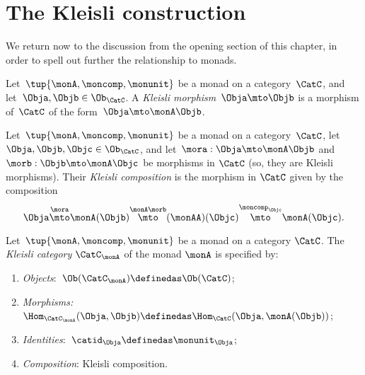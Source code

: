 
\section{The Kleisli construction}
\label{sec:Kleisli}

We return now to the discussion from the opening section of this chapter, in order to spell out further the relationship to monads.

\begin{ctdefinition}
    \label{def:kleislimor}
    Let~$\tup{\monA, \moncomp, \monunit}$ be a monad on a category~$\CatC$, and let~$\Obja, \Objb \in \Ob_\CatC$.
    A
    \emph{Kleisli morphism}~$\Obja \mto \Objb$ is a morphism of~$\CatC$ of the form~$\Obja \mto \monA \Objb$.
\end{ctdefinition}

\begin{ctdefinition}
    \label{def:kleislicomp}
    Let~$\tup{\monA, \moncomp, \monunit}$ be a monad on a category~$\CatC$, let~$\Obja, \Objb, \Objc \in \Ob_\CatC$,  and let~$\mora : \Obja \mto \monA \Objb$ and $\morb : \Objb \mto \monA \Objc$ be morphisms in $\CatC$ (so, they are Kleisli morphisms).
    Their \emph{Kleisli composition} is the morphism in $\CatC$ given by the composition
    \begin{equation}
        \Obja \overset{\mora}{\mto} \monA(\Objb) \overset{\monA \morb}{\mto} (\monAA)(\Objc) \overset{\moncomp_\Objc}{\mto} \monA(\Objc).
    \end{equation}
\end{ctdefinition}

\begin{ctdefinition}
    \label{def:kleislicat}
    Let~$\tup{\monA, \moncomp, \monunit}$ be a monad on a category $\CatC$.
    The \emph{Kleisli category} $\CatC_\monA$ of the monad $\monA$ is specified by:
    \begin{enumerate}
        \item \emph{Objects}:~$\Ob(\CatC_\monA) \definedas \Ob(\CatC)$;
        \item \emph{Morphisms:}~$\Hom_{\CatC_\monA}(\Obja, \Objb) \definedas \Hom_{\CatC}(\Obja, \monA(\Objb))$;
        \item \emph{Identities}:~$\catid_\Obja \definedas \monunit_\Obja$;
        \item \emph{Composition}: Kleisli composition.
    \end{enumerate}
\end{ctdefinition}

